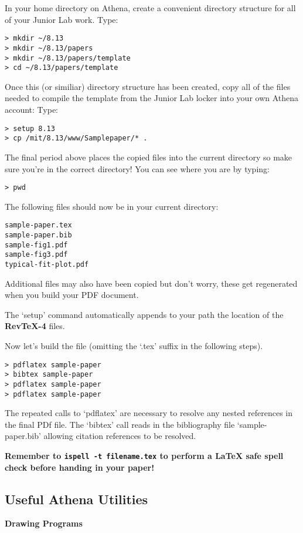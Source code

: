 In your home directory on Athena, create a convenient directory structure for all of your Junior Lab
work. Type:
\begin{verbatim}
> mkdir ~/8.13
> mkdir ~/8.13/papers
> mkdir ~/8.13/papers/template
> cd ~/8.13/papers/template
\end{verbatim}
Once this (or similiar) directory structure has been created, copy all
of the files needed to compile the template from the Junior Lab locker
into your own Athena account: Type: 
\begin{verbatim}
> setup 8.13
> cp /mit/8.13/www/Samplepaper/* .  
\end{verbatim}
The final period above places the
copied files into the current directory so make sure you're in the
correct directory!  You can see where you are by typing:
\begin{verbatim}
> pwd
\end{verbatim}
The following files should now be in
your current directory: 
\begin{verbatim}
sample-paper.tex
sample-paper.bib
sample-fig1.pdf 
sample-fig3.pdf 
typical-fit-plot.pdf
\end{verbatim}
Additional files may also have been copied but don't worry, these get
regenerated when you build your PDF document.

The `setup' command automatically
appends to your path the location of the {\bf RevTeX-4} files.

Now let's build the file (omitting the `.tex' suffix in the following steps).  



\begin{verbatim}
> pdflatex sample-paper
> bibtex sample-paper
> pdflatex sample-paper
> pdflatex sample-paper
\end{verbatim}


The repeated calls to `pdflatex' are necessary to resolve any nested
references in the final PDf file.  The `bibtex' call reads in the
bibliography file `sample-paper.bib' allowing citation references to
be resolved.

{\bf Remember to {\tt ispell -t filename.tex} to perform a \LaTeX
safe spell check before handing in your paper!}

\subsection{Useful
Athena Utilities} {\bf Drawing Programs}

